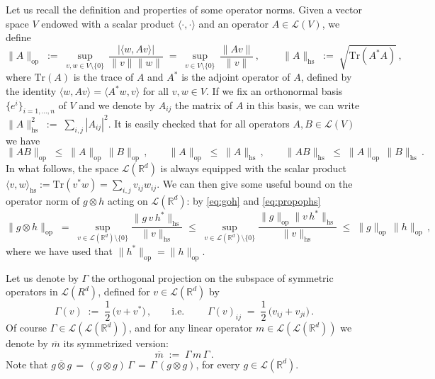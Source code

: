 \documentclass[a4paper,reqno,11pt]{amsart}
\numberwithin{equation}{section}
\newcommand{\cL}{{\ensuremath{\mathcal L}} }
\newcommand{\R}{\mathbb{R}}
\begin{document}
Let us recall the definition and properties
of some operator norms. Given a vector space $V$ endowed with
a scalar product $\langle \cdot, \cdot \rangle$ and an operator
$A \in \cL(V)$, we define
\begin{equation} \label{eq:ophs}
	\| A \|_{\text{op}} \;:=\; \sup_{v,w \in V \setminus \{0\}} \, 
	\frac{|\langle w, A v \rangle|}{\|v\| \|w\|} \;=\;
	\sup_{v \in V \setminus \{0\}} \, \frac{\| Av \|}{\| v \|}\,, \qquad \
	\| A \|_{\text{hs}} \;:=\; \sqrt{\text{Tr}(A^* A)}\,,
\end{equation}
where $\text{Tr}(A)$ is the trace of $A$ and $A^*$ is the adjoint operator
of $A$, defined by the identity $\langle w, A v \rangle = \langle A^* w, v \rangle$
for all $v,w \in V$. If we fix an orthonormal basis $\{e^i\}_{i=1, \ldots, n}$
of $V$ and we denote by $A_{ij}$ the matrix of $A$ in this basis, we can write
$\| A \|_{\text{hs}}^2 \;:=\; \sum_{i,j} |A_{ij}|^2$.
It is easily checked that for all operators $A, B \in \cL(V)$ we have
\begin{equation} \label{eq:propophs}
	\|AB \|_{\text{op}} \;\le\; \|A\|_{\text{op}}\, \|B\|_{\text{op}}\,,
	\qquad 
	\| A \|_{\text{op}} \;\le\; \|A\|_{\text{hs}} \,, \qquad
	\| A B \|_{\text{hs}} \;\le\; 
	\|A\|_{\text{op}} \, \|B\|_{\text{hs}} \,.
\end{equation}
In what follows, the space $\cL(\R^d)$ is always equipped with the scalar product
$\langle v, w \rangle_{\text{hs}} := \text{Tr}(v^* w) = \sum_{i,j} v_{ij} w_{ij}$.
We can then give some useful bound on the operator norm of $g \otimes h$
acting on $\cL(\R^d)$: by \eqref{eq:goh} and \eqref{eq:propophs}
\begin{equation}
\label{eq:opineq}
\|g \otimes h\|_{\text{op}} \;=\;
\sup_{v \in \cL(\R^d) \setminus \{0\}}
\frac{\| g\, v\, h^* \|_{\text{hs}}}{\|v\|_{\text{hs}}}
\;\le\; \sup_{v \in \cL(\R^d) \setminus \{0\}}
\frac{\| g \|_{\text{op}} \|v\, h^* \|_{\text{hs}}}{\|v\|_{\text{hs}}}
\;\le\; \|g\|_{\text{op}} \, \|h\|_{\text{op}} \,,
\end{equation}
where we have used that $\|h^*\|_{\text{op}} = \|h\|_{\text{op}}$.

Let us denote by $\Gamma$ the orthogonal projection
on the subspace of symmetric operators in $\cL(R^d)$, defined 
for $v \in \cL(\R^d)$ by
\begin{equation} \label{eq:symm0}
	\Gamma(v) \;:=\; \frac 12 \,\big( v + v^*)\,, \qquad
	\text{i.e. } \qquad \Gamma(v)_{ij} \;=\; \frac 12 \,
	\big( v_{ij} + v_{ji} \big) \,.
\end{equation}
Of course $\Gamma \in \cL(\cL(\R^d))$, and for
any linear operator $m \in \cL(\cL(\R^d))$ we denote by $\overline m$ 
its symmetrized version:
\begin{equation} \label{eq:symm1}
	\overline m \;:=\; \Gamma \, m \, \Gamma \,.
\end{equation}
Note that $\overline{g \otimes g} 
\,=\, (g \otimes g)\, \Gamma \,=\, \Gamma \,(g \otimes g)$,
for every $g \in \cL(\R^d)$.
\end{document}
